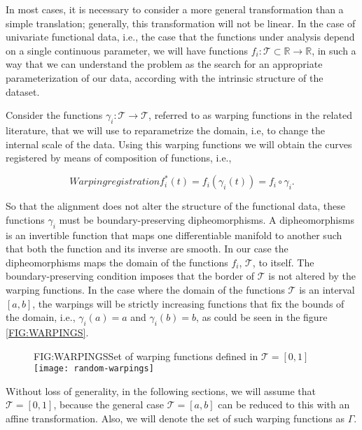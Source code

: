In most cases, it is necessary to consider a more general transformation than a
simple translation; generally, this transformation will not be linear. In the
case of univariate functional data, i.e., the case that the functions under
analysis
depend on a single continuous parameter, we will have functions
$f_i: \mathcal{T} \subset \mathbb{R} \rightarrow \mathbb{R}$, in such a way that
we can understand
the problem as the search for an appropriate parameterization of our data,
according with the intrinsic structure of the dataset.

Consider the functions $\gamma_i: \mathcal{T} \rightarrow \mathcal{T}$,
referred to as warping functions in the related literature, that we will use to
reparametrize the domain, i.e, to change the internal scale of the data.
Using this warping functions we will
obtain the curves registered by means of composition of functions, i.e.,

\begin{equation}[]{Warping registration}
f_i^*(t)=f_i(\gamma_i(t)) = f_i \circ \gamma _i.
\end{equation}

So that the alignment does not alter the structure of the functional data,
these functions $\gamma_i$ must be boundary-preserving dipheomorphisms.
A dipheomorphisms is an invertible function that maps one differentiable
manifold to another such that both the function and its inverse are smooth.
In our case the dipheomorphisms maps the domain of the functions $f_i$,
$\mathcal{T}$, to itself. The boundary-preserving condition imposes that the
border of $\mathcal{T}$ is not altered by the warping functions.
In the
case where the domain of the functions $\mathcal{T}$ is an interval $[a,b]$, the
warpings will be strictly increasing functions that fix the bounds of the
domain, i.e., $\gamma_i(a)=a$ and $\gamma_i(b)=b$, as could be seen in the
figure \ref{FIG:WARPINGS}.

\begin{figure}[Set of warping functions]{FIG:WARPINGS}{Set of warping functions defined in $\mathcal{T}=[0,1]$}
  \texttt{[image: random-warpings]}
\end{figure}

Without loss of generality, in the following sections, we
will assume that $\mathcal{T}=[0,1]$, because the general case
$\mathcal{T}=[a,b]$ can be reduced to this with an affine transformation. Also,
we will denote the set of such warping functions as $\Gamma$.
